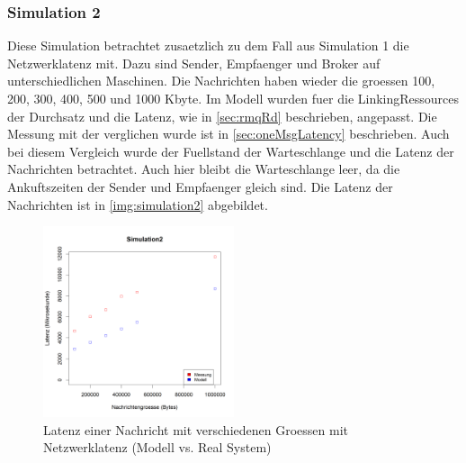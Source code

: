 \subsubsection{Simulation 2} 
Diese Simulation betrachtet zusaetzlich zu dem Fall aus Simulation 1 die Netzwerklatenz mit. Dazu sind Sender, Empfaenger und Broker auf unterschiedlichen Maschinen. Die Nachrichten haben wieder die groessen 100, 200, 300, 400, 500 und 1000 Kbyte. Im Modell wurden fuer die LinkingRessources der Durchsatz und die Latenz, wie in \autoref{sec:rmqRd} beschrieben, angepasst. Die Messung mit der verglichen wurde ist in \autoref{sec:oneMsgLatency} beschrieben. Auch bei diesem Vergleich wurde der Fuellstand der Warteschlange und die Latenz der Nachrichten betrachtet. 
Auch hier bleibt die Warteschlange leer, da die Ankuftszeiten der Sender und Empfaenger gleich sind. Die Latenz der Nachrichten ist in \autoref{img:simulation2} abgebildet. 
\begin{figure}
\center
  \includegraphics[width=0.5\textwidth]{images/modelSimulationResults/simulation2.png}
  \caption{Latenz einer Nachricht mit verschiedenen Groessen mit Netzwerklatenz (Modell vs. Real System)}
  \label{img:simulation2}
\end{figure}



